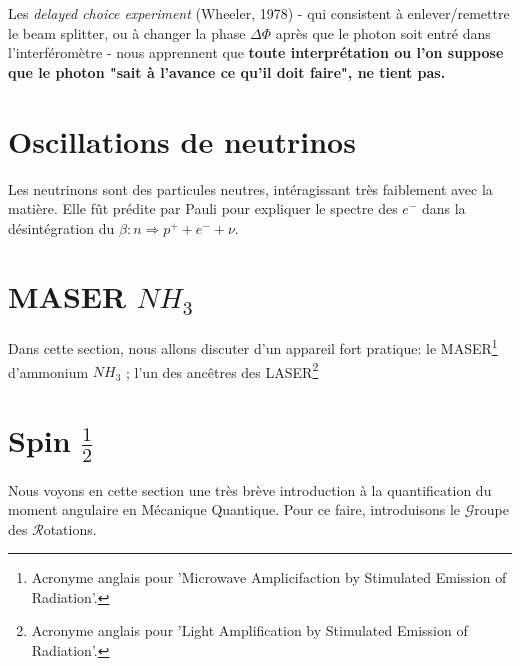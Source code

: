 \documentclass[../notesdecours.tex]{subfiles}
\begin{document}
Les \emph{delayed choice experiment} (Wheeler, 1978) - qui consistent à enlever/remettre le beam splitter, ou à changer la phase $\Delta\Phi$ après que le photon soit entré dans l'interféromètre - nous apprennent que \textbf{toute interprétation ou l'on suppose que le photon "sait à l'avance ce qu'il doit faire", ne tient pas.}

\section{Oscillations de neutrinos}
Les neutrinons sont des particules neutres, intéragissant très faiblement avec la matière. Elle fût prédite par Pauli pour expliquer le spectre des $e^-$ dans la désintégration du $\beta : n \Rightarrow p^+ + e^- + \nu$.

\section{MASER $NH_3$}
Dans cette section, nous allons discuter d'un appareil fort pratique: le MASER\footnote{Acronyme anglais pour 'Microwave Amplicifaction by Stimulated Emission of Radiation'.} d'ammonium $NH_3$ ; l'un des ancêtres des LASER\footnote{Acronyme anglais pour 'Light Amplification by Stimulated Emission of Radiation'.}

\section{Spin $\frac{1}{2}$}
Nous voyons en cette section une très brève introduction à la quantification du moment angulaire en Mécanique Quantique. Pour ce faire, introduisons le $\mathcal{G}$roupe des $\mathcal{R}$otations.
\end{document}
